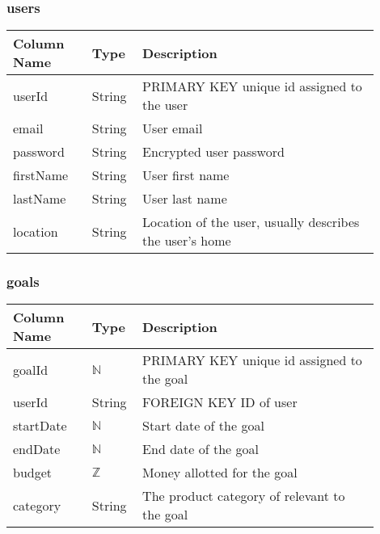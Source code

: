 \documentclass[12pt, titlepage]{article}
\begin{document}
\subsubsection{users}
\begin{table}[H]
  \begin{tabular}{|p{0.2\linewidth}|p{0.1\linewidth}|p{0.6\linewidth}|}
    \hline
    \textbf{Column Name} & \textbf{Type} & \textbf{Description} \\
    \hline
    userId & String & PRIMARY KEY unique id assigned to the user \\
    \hline
    email & String & User email \\
    \hline
    password & String & Encrypted user password \\
    \hline
    firstName & String & User first name \\
    \hline
    lastName & String & User last name \\
    \hline
    location & String & Location of the user, usually describes the user's home\\
    \hline
  \end{tabular}
\end{table}

\subsubsection{goals}
\begin{table}[H]
  \begin{tabular}{|p{0.2\linewidth}|p{0.1\linewidth}|p{0.6\linewidth}|}
    \hline
    \textbf{Column Name} & \textbf{Type} & \textbf{Description} \\
    \hline
    goalId & $\mathbb{N}$ & PRIMARY KEY unique id assigned to the goal \\
    \hline
    userId & String & FOREIGN KEY ID of user \\
    \hline
    startDate & $\mathbb{N}$ & Start date of the goal \\
    \hline
    endDate & $\mathbb{N}$ & End date of the goal \\
    \hline
    budget & $\mathbb{Z}$ & Money allotted for the goal \\
    \hline
    category & String & The product category of relevant to the goal\\
    \hline
  \end{tabular}
\end{table}
\end{document}
